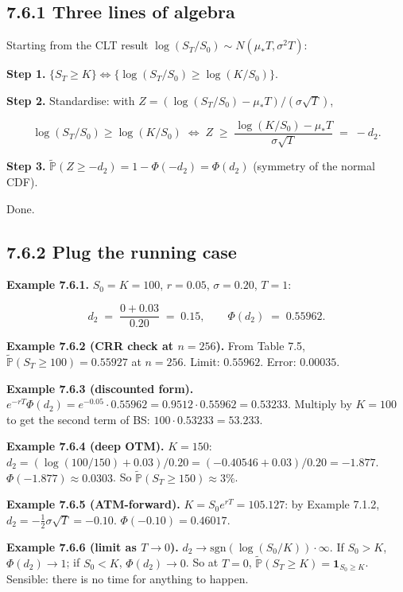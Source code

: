 \documentclass[
  10pt,
  twoside]{book}
\begin{document}
\subsection{7.6.1 Three lines of algebra}\label{three-lines-of-algebra}

Starting from the CLT result
\(\log(S_T/S_0) \sim N(\mu_* T, \sigma^2 T)\):

\textbf{Step 1.}
\(\{S_T \ge K\} \iff \{\log(S_T/S_0) \ge \log(K/S_0)\}\).

\textbf{Step 2.} Standardise: with
\(Z = (\log(S_T/S_0) - \mu_* T)/(\sigma\sqrt T)\),

\[\log(S_T/S_0) \ge \log(K/S_0) \;\iff\; Z \;\ge\; \frac{\log(K/S_0) - \mu_* T}{\sigma\sqrt T} \;=\; -d_2.\]

\textbf{Step 3.}
\(\tilde{\mathbb P}(Z \ge -d_2) = 1 - \Phi(-d_2) = \Phi(d_2)\) (symmetry
of the normal CDF).

Done.

\subsection{7.6.2 Plug the running case}\label{plug-the-running-case}

\textbf{Example 7.6.1.} \(S_0 = K = 100\), \(r = 0.05\),
\(\sigma = 0.20\), \(T = 1\):

\[d_2 \;=\; \frac{0 + 0.03}{0.20} \;=\; 0.15, \qquad \Phi(d_2) \;=\; 0.55962.\]

\textbf{Example 7.6.2 (CRR check at \(n = 256\)).} From Table 7.5,
\(\tilde{\mathbb P}(S_T \ge 100) = 0.55927\) at \(n = 256\). Limit:
\(0.55962\). Error: \(0.00035\).

\textbf{Example 7.6.3 (discounted form).}
\(e^{-rT} \Phi(d_2) = e^{-0.05} \cdot 0.55962 = 0.9512 \cdot 0.55962 = 0.53233\).
Multiply by \(K = 100\) to get the second term of BS:
\(100 \cdot 0.53233 = 53.233\).

\textbf{Example 7.6.4 (deep OTM).} \(K = 150\):
\(d_2 = (\log(100/150) + 0.03)/0.20 = (-0.40546 + 0.03)/0.20 = -1.877\).
\(\Phi(-1.877) \approx 0.0303\). So
\(\tilde{\mathbb P}(S_T \ge 150) \approx 3\%\).

\textbf{Example 7.6.5 (ATM-forward).} \(K = S_0 e^{rT} = 105.127\): by
Example 7.1.2, \(d_2 = -\tfrac{1}{2}\sigma\sqrt T = -0.10\).
\(\Phi(-0.10) = 0.46017\).

\textbf{Example 7.6.6 (limit as \(T \to 0\)).}
\(d_2 \to \mathrm{sgn}(\log(S_0/K))\cdot \infty\). If \(S_0 > K\),
\(\Phi(d_2) \to 1\); if \(S_0 < K\), \(\Phi(d_2) \to 0\). So at
\(T = 0\), \(\tilde{\mathbb P}(S_T \ge K) = \mathbf 1_{S_0 \ge K}\).
Sensible: there is no time for anything to happen.
\end{document}
